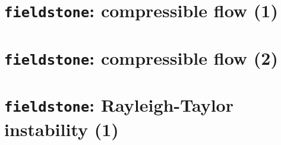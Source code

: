 \documentclass[a4paper]{article}
\begin{document}
\newpage
\section{{\tt fieldstone}: compressible flow (1)}


\newpage
\section{{\tt fieldstone}: compressible flow (2)}


\newpage
\section{{\tt fieldstone}: Rayleigh-Taylor instability (1)}

\end{document}
